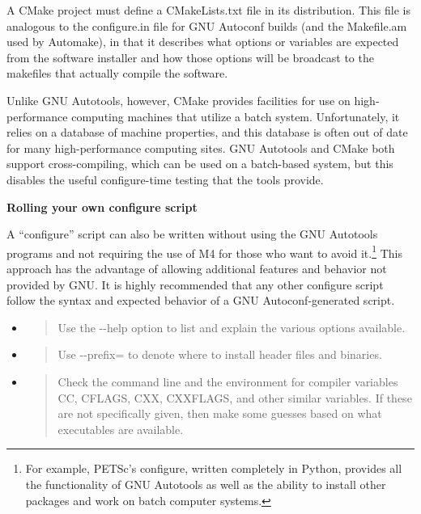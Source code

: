 \documentclass[]{article}
\begin{document}
A CMake project must define a CMakeLists.txt file in its distribution.
This file is analogous to the configure.in file for GNU Autoconf builds
(and the Makefile.am used by Automake), in that it describes what
options or variables are expected from the software installer and how
those options will be broadcast to the makefiles that actually compile
the software.

Unlike GNU Autotools, however, CMake provides facilities for use on
high-performance computing machines that utilize a batch system.
Unfortunately, it relies on a database of machine properties, and this
database is often out of date for many high-performance computing sites.
GNU Autotools and CMake both support cross-compiling, which can be used
on a batch-based system, but this disables the useful configure-time
testing that the tools provide.

\textbf{Rolling your own configure script}

A ``configure'' script can also be written without using the GNU
Autotools programs and not requiring the use of M4 for those who want to
avoid it.\footnote{For example, PETSc's configure, written completely in
  Python, provides all the functionality of GNU Autotools as well as the
  ability to install other packages and work on batch computer systems.}
This approach has the advantage of allowing additional features and
behavior not provided by GNU. It is highly recommended that any other
configure script follow the syntax and expected behavior of a GNU
Autoconf-generated script.

\begin{itemize}
\item
  \begin{quote}
  Use the -\/-help option to list and explain the various options
  available.
  \end{quote}
\item
  \begin{quote}
  Use -\/-prefix= to denote where to install header files and binaries.
  \end{quote}
\item
  \begin{quote}
  Check the command line and the environment for compiler variables CC,
  CFLAGS, CXX, CXXFLAGS, and other similar variables. If these are not
  specifically given, then make some guesses based on what executables
  are available.
  \end{quote}
\end{itemize}
\end{document}
